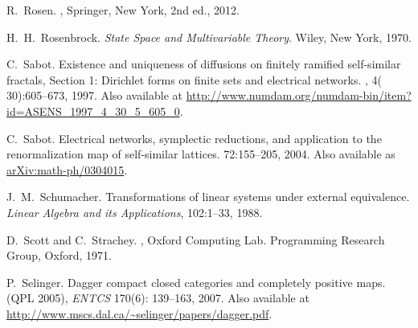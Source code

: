 \begin{thebibliography}{RSW00}
    R.\ Rosen.
    , Springer, New York, 2nd ed., 2012.

    H.\ H.\ Rosenbrock.
    \newblock \emph{State Space and Multivariable Theory}.
    Wiley, New York, 1970. 


    C.\ Sabot.
    \newblock Existence and uniqueness of diffusions on
    finitely ramified self-similar fractals, Section 1: Dirichlet forms on
    finite sets and electrical networks.
    , 4({ 30}):605--673, 1997.
    \newblock Also available at
    \href{http://www.numdam.org/numdam-bin/item?id=ASENS_1997_4_30_5_605_0}{http://www.numdam.org/numdam-bin/item?id=ASENS\_1997\_4\_30\_5\_605\_0}.

    C.\ Sabot.
    \newblock Electrical networks, symplectic reductions, and
    application to the renormalization map of self-similar lattices.
     { 72}:155--205, 2004.
    \newblock Also available as
    \href{http://arxiv.org/abs/math-ph/0304015}{arXiv:math-ph/0304015}.
    

    J.\ M.\ Schumacher.
    \newblock Transformations of linear systems under
    external equivalence.
    \newblock \emph{Linear Algebra and its Applications}, 102:1--33, 1988.

    D.\ Scott and C.\ Strachey.
    ,
    Oxford Computing Lab. Programming Research Group, Oxford, 1971.


    P.\ Selinger.
    \newblock Dagger compact closed categories and completely
    positive maps.
     (QPL 2005), {\sl ENTCS} { 170}(6):
    139--163, 2007.
    \newblock Also available at
    \href{http://www.mscs.dal.ca/~selinger/papers/dagger.pdf}{http://www.mscs.dal.ca/\~{}selinger/papers/dagger.pdf}.


\end{thebibliography}
